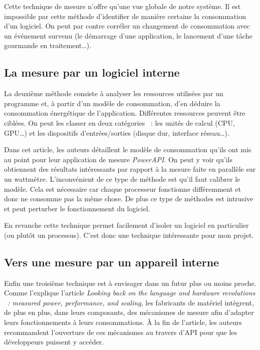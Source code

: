 \documentclass[a4paper, 11pt]{report}
\begin{document}
Cette technique de mesure n'offre qu'une vue globale de notre système. Il est impossible par cette méthode d'identifier de manière certaine la consommation d'un logiciel. On peut par contre corréler un changement de consommation avec un événement survenu\cite{GreenMining} (le démarrage d'une application, le lancement d'une tâche gourmande en traitement\ldots). 

			\subsection{La mesure par un logiciel interne}
La deuxième méthode consiste à analyser les ressources utilisées par un programme et, à partir d'un modèle de consommation, d'en déduire la consommation énergétique de l'application\cite{da2010methodology}. Différentes ressources peuvent être ciblées. On peut les classer en deux catégories ~: les unités de calcul (CPU, GPU\ldots) et les dispositifs d'entrées/sorties (disque dur, interface réseau\ldots).

Dans cet article\cite{noureddine:hal-00681560}, les auteurs détaillent le modèle de consommation qu'ils ont mis au point pour leur application de mesure \textit{PowerAPI}. On peut y voir qu'ils obtiennent des résultats intéressants par rapport à la mesure faite en parallèle sur un wattmètre. L'inconvénient de ce type de méthode est qu'il faut calibrer le modèle. Cela est nécessaire car chaque processeur  fonctionne différemment et donc ne consomme pas la même chose. De plus ce type de méthodes est intrusive et peut perturber le fonctionnement du logiciel.

En revanche cette technique permet facilement d'isoler un logiciel en particulier (ou plutôt un processus). C'est donc une technique intéressante pour mon projet.

			\subsection{Vers une mesure par un appareil interne}
Enfin une troisième technique est à envisager dans un futur plus ou moins proche. Comme l'explique l'article \textit{Looking back on the language and hardware revolutions
~: measured power, performance, and scaling}\cite{Esmaeilzadeh:2011:LBL:1950365.1950402}, les fabricants de matériel intègrent, de plus en plus, dans leurs composants, des mécanismes de mesure afin d'adapter leurs fonctionnements à leurs consommations. À la fin de l'article, les auteurs recommandent l'ouverture de ces mécanismes au travers d'API pour que les développeurs puissent y accéder.
\end{document}
